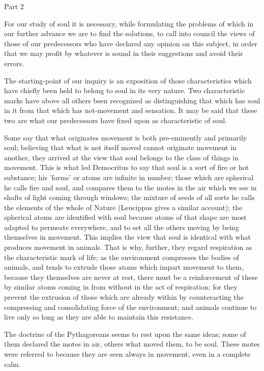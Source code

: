 Part 2

For our study of soul it is necessary, while formulating the problems
of which in our further advance we are to find the solutions, to call
into council the views of those of our predecessors who have declared
any opinion on this subject, in order that we may profit by whatever
is sound in their suggestions and avoid their errors. 

The starting-point of our inquiry is an exposition of those characteristics
which have chiefly been held to belong to soul in its very nature.
Two characteristic marks have above all others been recognized as
distinguishing that which has soul in it from that which has not-movement
and sensation. It may be said that these two are what our predecessors
have fixed upon as characteristic of soul. 

Some say that what originates movement is both pre-eminently and primarily
soul; believing that what is not itself moved cannot originate movement
in another, they arrived at the view that soul belongs to the class
of things in movement. This is what led Democritus to say that soul
is a sort of fire or hot substance; his 'forms' or atoms are infinite
in number; those which are spherical he calls fire and soul, and compares
them to the motes in the air which we see in shafts of light coming
through windows; the mixture of seeds of all sorts he calls the elements
of the whole of Nature (Leucippus gives a similar account); the spherical
atoms are identified with soul because atoms of that shape are most
adapted to permeate everywhere, and to set all the others moving by
being themselves in movement. This implies the view that soul is identical
with what produces movement in animals. That is why, further, they
regard respiration as the characteristic mark of life; as the environment
compresses the bodies of animals, and tends to extrude those atoms
which impart movement to them, because they themselves are never at
rest, there must be a reinforcement of these by similar atoms coming
in from without in the act of respiration; for they prevent the extrusion
of those which are already within by counteracting the compressing
and consolidating force of the environment; and animals continue to
live only so long as they are able to maintain this resistance.

The doctrine of the Pythagoreans seems to rest upon the same ideas;
some of them declared the motes in air, others what moved them, to
be soul. These motes were referred to because they are seen always
in movement, even in a complete calm. 

